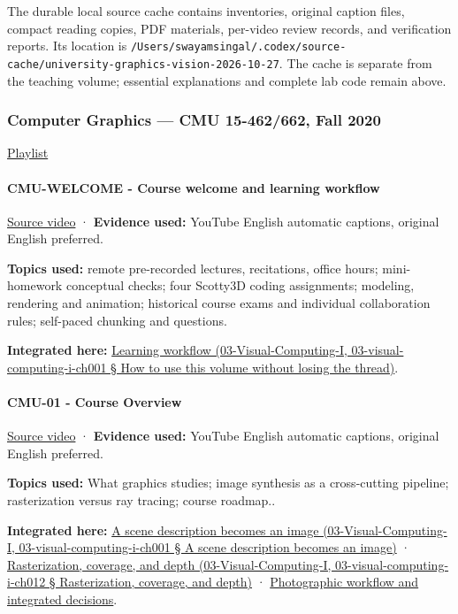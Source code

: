 The durable local source cache contains inventories, original caption files, compact reading copies, PDF materials, per-video review records, and verification reports. Its location is \texttt{/Users/swayamsingal/.codex/source-cache/university-graphics-vision-2026-10-27}. The cache is separate from the teaching volume; essential explanations and complete lab code remain above.

\subsubsection{Computer Graphics --- CMU 15-462/662, Fall 2020}\label{computer-graphics-cmu-15-462662-fall-2020}

\href{https://www.youtube.com/playlist?list=PL9_jI1bdZmz2emSh0UQ5iOdT2xRHFHL7E}{Playlist}

\paragraph{CMU-WELCOME - Course welcome and learning workflow}\label{cmu-welcome---course-welcome-and-learning-workflow}

\href{https://www.youtube.com/watch?v=W6yEALqsD7k}{Source video} · \textbf{Evidence used:} YouTube English automatic captions, original English preferred.

\textbf{Topics used:} remote pre-recorded lectures, recitations, office hours; mini-homework conceptual checks; four Scotty3D coding assignments; modeling, rendering and animation; historical course exams and individual collaboration rules; self-paced chunking and questions.

\textbf{Integrated here:} \href{}{Learning workflow (03-Visual-Computing-I, 03-visual-computing-i-ch001 § How to use this volume without losing the thread)}.

\paragraph{CMU-01 - Course Overview}\label{cmu-01---course-overview}

\href{https://www.youtube.com/watch?v=PhxV_JrXeVk}{Source video} · \textbf{Evidence used:} YouTube English automatic captions, original English preferred.

\textbf{Topics used:} What graphics studies; image synthesis as a cross-cutting pipeline; rasterization versus ray tracing; course roadmap..

\textbf{Integrated here:} \href{}{A scene description becomes an image (03-Visual-Computing-I, 03-visual-computing-i-ch001 § A scene description becomes an image)} · \href{}{Rasterization, coverage, and depth (03-Visual-Computing-I, 03-visual-computing-i-ch012 § Rasterization, coverage, and depth)} · \hyperref[04-visual-computing-ii-ch034]{Photographic workflow and integrated decisions}.

